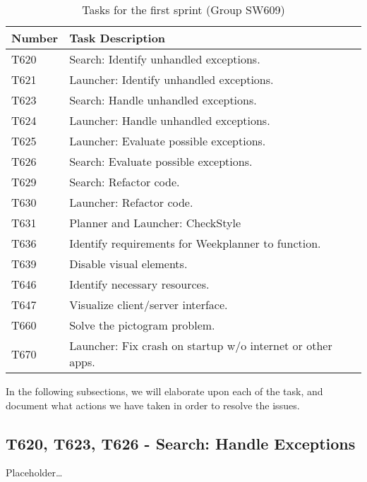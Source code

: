 \begin{table}[H]
\centering
\begin{tabular}{|l|l|}
\hline
Number 			& Task Description 											\\\hline
T620  			& Search: Identify unhandled exceptions.                 	\\\hline
T621    	   	& Launcher: Identify unhandled exceptions. 					\\\hline 
T623	       	& Search: Handle unhandled exceptions.                 		\\\hline
T624    	   	& Launcher: Handle unhandled exceptions.  					\\\hline
T625   	   		& Launcher: Evaluate possible exceptions.        			\\\hline
T626   	   		& Search: Evaluate possible exceptions.                		\\\hline
T629  	   		& Search: Refactor code.			   						\\\hline
T630       		& Launcher: Refactor code.                 					\\\hline
T631       		& Planner and Launcher: CheckStyle                 			\\\hline
T636       		& Identify requirements for Weekplanner to function.   		\\\hline 
T639       		& Disable visual elements.                 					\\\hline
T646       		& Identify necessary resources.                 			\\\hline
T647       		& Visualize client/server interface.                 		\\\hline 
T660       		& Solve the pictogram problem.                 				\\\hline
T670       		& Launcher: Fix crash on startup w/o internet or other apps.\\\hline
\end{tabular}
\label{S01:Tasks}  
\caption{Tasks for the first sprint (Group SW609)}
\end{table}

In the following subsections, we will elaborate upon each of the task, and
document what actions we have taken in order to resolve the issues.

\subsection{T620, T623, T626 - Search: Handle Exceptions}
Placeholder\ldots

